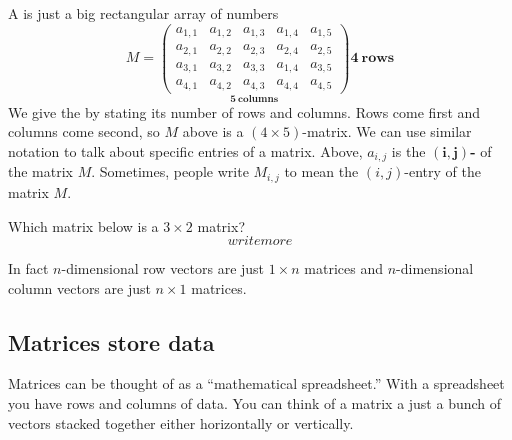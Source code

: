 \documentclass{ximera}
\begin{document}
A  is just a big rectangular array of numbers
\[
M =
\underset{\displaystyle\boldsymbol{5}~\textbf{columns}}{\begin{pmatrix}
  a_{1,1} & a_{1,2} & a_{1,3} & a_{1,4} & a_{1,5} \\
  a_{2,1} & a_{2,2} & a_{2,3} & a_{2,4} & a_{2,5} \\
  a_{3,1} & a_{3,2} & a_{3,3} & a_{1,4} & a_{3,5} \\
  a_{4,1} & a_{4,2} & a_{4,3} & a_{4,4} & a_{4,5}
\end{pmatrix}}
\boldsymbol{4}~\textbf {rows}
\]
We give the  by stating its number of rows
and columns. Rows come first and columns come second, so $M$ above is
a $(4\times 5)$-matrix. We can use similar notation to talk about
specific entries of a matrix. Above, $a_{i,j}$ is the
$\boldsymbol{(i,j)}${\bf-} of the matrix $M$. Sometimes,
people write $M_{i,j}$ to mean the $(i,j)$-entry of the matrix $M$.

\begin{question}
  Which matrix below is a $3\times 2$ matrix?
  \[
  write more
  \]
\end{question}
In fact $n$-dimensional row vectors are just $1\times n$ matrices and
$n$-dimensional column vectors are just $n\times 1$ matrices.


\subsection{Matrices store data}


Matrices can be thought of as a ``mathematical spreadsheet.'' With a
spreadsheet you have rows and columns of data.  You can think of a
matrix a just a bunch of vectors stacked together either horizontally
or vertically.
\end{document}
